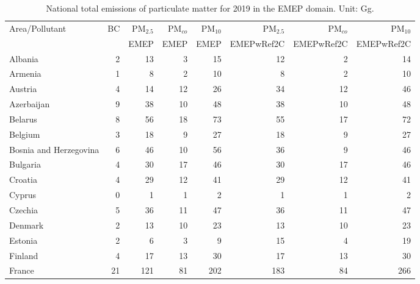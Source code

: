 \begin{table}
\caption{National total emissions of particulate matter for 2019 in the EMEP
  domain. Unit: Gg. }
\label{tab:2019emisPM}

\vspace{15pt}

\begin{center}
\scriptsize
\begin{tabular}{|l|r|r|r|r||r|r|r|}
\hline
 Area/Pollutant& BC&PM$_{2.5}$&PM$_{co}$&PM$_{10}$&PM$_{2.5}$&PM$_{co}$&PM$_{10}$\\
 &&EMEP&EMEP&EMEP&EMEPwRef2C&EMEPwRef2C&EMEPwRef2C\\\hline\hline
                       Albania&     2&    13&     3&    15&    12&     2&    14 \\\hline
                       Armenia&     1&     8&     2&    10&     8&     2&    10 \\\hline
                       Austria&     4&    14&    12&    26&    34&    12&    46 \\\hline
                    Azerbaijan&     9&    38&    10&    48&    38&    10&    48 \\\hline
                       Belarus&     8&    56&    18&    73&    55&    17&    72 \\\hline
                       Belgium&     3&    18&     9&    27&    18&     9&    27 \\\hline
        Bosnia and Herzegovina&     6&    46&    10&    56&    36&     9&    46 \\\hline
                      Bulgaria&     4&    30&    17&    46&    30&    17&    46 \\\hline
                       Croatia&     4&    29&    12&    41&    29&    12&    41 \\\hline
                        Cyprus&     0&     1&     1&     2&     1&     1&     2 \\\hline
                       Czechia&     5&    36&    11&    47&    36&    11&    47 \\\hline
                       Denmark&     2&    13&    10&    23&    13&    10&    23 \\\hline
                       Estonia&     2&     6&     3&     9&    15&     4&    19 \\\hline
                       Finland&     4&    17&    13&    30&    17&    13&    30 \\\hline
                        France&    21&   121&    81&   202&   183&    84&   266 \\\hline

\end{tabular}
\end{center}
\end{table}
